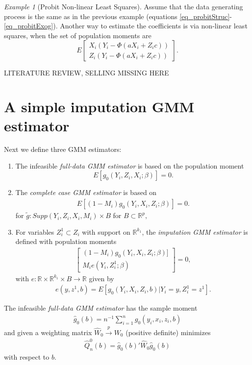 \documentclass{article}
\theoremstyle{definition}
\theoremstyle{remark}
\newtheorem{example}{Example}
\begin{document}
\begin{example}[Probit Non-linear Least Squares]
	 Assume that the data generating process is the same as in the previous example (equations \eqref{eq_probitStruc}-\eqref{eq_probitExog}). Another way to estimate the coefficients is via non-linear least squares, when the set of population moments are
	\[E\left[\begin{array}{c}
	X_i(Y_i-\Phi(aX_i+Z_ic))\\
	Z_i(Y_i-\Phi(aX_i+Z_ic))
	\end{array}
	\right].
	\]
\end{example}

{\color{red} LITERATURE REVIEW, SELLING MISSING HERE}

\section{A simple imputation GMM estimator}
Next we define three GMM estimators: 
\begin{enumerate}
	\item The infeasible \emph{full-data GMM estimator} is based on the population moment
	\[E[g_0(Y_i, Z_i, X_i; \beta)]=0.
	\]
	\item The \emph{complete case GMM estimator} is based on
	\begin{align}
	E\left[(1-M_i) g_0(Y_i, X_i,Z_i; \beta )\right]=0.
	\end{align}
	for $\tilde{g}: Supp(Y_i, Z_i, X_i, M_i) \times B$ for $B \subset \mathbb{R}^p,$
	\item For variables $Z^1_i \subset Z_i$ with support on $\mathbb{R}^{k_1}$, the \emph{imputation GMM estimator} is defined with population moments
	\begin{align}
	\left[\begin{array}{c}
	(1-M_i) g_0(Y_i,X_i,Z_i;\beta)]\\
	M_i e(Y_i, Z_i^1; \beta)
	\end{array}\right]=0,
	\end{align}
	with $e: \mathbb{R} \times \mathbb{R}^{k_1}\times B \rightarrow \mathbb{R}$ given by
	\begin{align}
	e(y, z^1,b)= E[g_0(Y_i, X_i,Z_i, b)|Y_i=y, Z_i^1=z^1].
	\end{align}
\end{enumerate}

The infeasible \emph{full-data GMM estimator} has the sample moment
\begin{align}
\hat{g}_0(b) = n^{-1}\sum_{i=1}^n g_0(y_i,x_i,z_i,b)
\end{align}
and given a weighting matrix $\hat{W}_0\stackrel{p}{\rightarrow} W_0$ (positive definite) minimizes
\begin{align}
\hat{Q}^0_n(b)= \hat{g}_0(b)'\hat{W}_0\hat{g}_0(b)
\end{align}
with respect to $b$.
\end{document}
